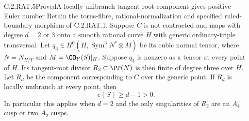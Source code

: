 \begin{statement}{C.2.RAT.5}{Proved}{A locally unibranch tangent-root component gives positive Euler number}
Retain the torus-fibre, rational-normalization and specified
ruled-boundary morphism of C.2.RAT.1. Suppose $C$ is not
contracted and maps with degree $d=2$ or $3$ onto a smooth
rational curve $H$ with generic ordinary-triple transversal.
Let $q_3\in H^0(H,\operatorname{Sym}^3N^*\otimes M)$ be
its cubic normal tensor, where $N=N_{H/Y}$ and
$M=\OO_Y(S)|_H$. Suppose $q_3$ is nonzero as a tensor at
every point of $H$. Its tangent-root divisor
$R_3\subset\PP(N)$ is then finite of degree three over $H$.
Let $R_d$ be the component corresponding to $C$ over the
generic point. If $R_d$ is locally unibranch at every point,
then
\[
                           e(S)\ge d-1>0.
\tag{C.RD.1}
\]
In particular this applies when $d=2$ and the only singularities
of $R_2$ are an $A_4$ cusp or two $A_2$ cusps.
\end{statement}
